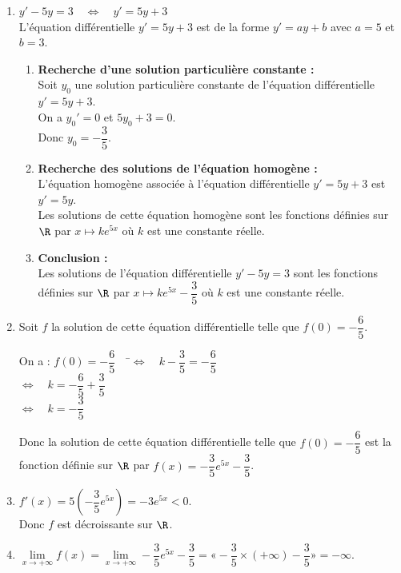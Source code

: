\documentclass[a4paper,11pt,exos]{nsi} %
\begin{document}
\textcolor{UGLiBlue}{
    \begin{enumerate}
        \item $y'-5y=3 \quad \iff \quad y'=5y+3$\\
        L'équation différentielle $y'=5y+3$ est de la forme $y'=ay+b$ avec $a=5$ et $b=3$.
        \begin{enumerate}[label=\textbullet]
            \item \textbf{Recherche d'une solution particulière constante :}\\
            Soit $y_0$ une solution particulière constante de l'équation différentielle $y'=5y+3$.\\
            On a $y_0'=0$ et $5y_0+3=0$.\\
            Donc $y_0=-\dfrac{3}{5}$.
            \item \textbf{Recherche des solutions de l'équation homogène :}\\
            L'équation homogène associée à l'équation différentielle $y'=5y+3$ est $y'=5y$.\\
            Les solutions de cette équation homogène sont les fonctions définies sur $\R$ par $x\mapsto ke^{5x}$ où $k$ est une constante réelle.
            \item \textbf{Conclusion :}\\
            Les solutions de l'équation différentielle $y'-5y=3$ sont les fonctions définies sur $\R$ par $x\mapsto ke^{5x}- \dfrac{3}{5}$ où $k$ est une constante réelle.
        \end{enumerate}
        \item Soit $f$ la solution de cette équation différentielle telle que $f(0)=-\dfrac{6}{5}$.
        \begin{tabbing}
            On a : $f(0)=-\dfrac{6}{5} \quad$ \=$\iff \quad k-\dfrac{3}{5}=-\dfrac{6}{5}$\\[.5em]
            \> $\iff \quad k=-\dfrac{6}{5}+\dfrac{3}{5}$\\[.5em]
            \> $\iff \quad k=-\dfrac{3}{5}$
        \end{tabbing}
        Donc la solution de cette équation différentielle telle que $f(0)=-\dfrac{6}{5}$ est la fonction définie sur $\R$ par $f(x)=-\dfrac{3}{5}e^{5x}- \dfrac{3}{5}$.
        \item $f'(x)=5(-\dfrac{3}{5}e^{5x})= -3e^{5x}<0$.\\[.5em]
        Donc $f$ est décroissante sur $\R$.
        \item $\lim\limits_{x\to +\infty}f(x)=\lim\limits_{x\to +\infty}-\dfrac{3}{5}e^{5x}- \dfrac{3}{5}=« -\dfrac{3}{5}\times (+\infty)- \dfrac{3}{5} »=-\infty$.\\[.5em]

\end{enumerate}}
\end{document}
